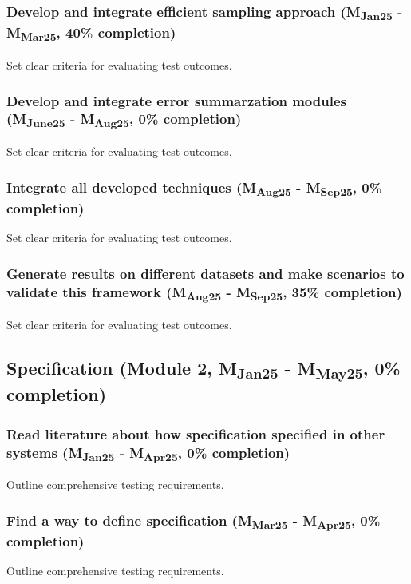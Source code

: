 \subsubsection{Develop and integrate efficient sampling approach (M\textsubscript{Jan25} - M\textsubscript{Mar25}, 40\% completion)}
Set clear criteria for evaluating test outcomes.

\subsubsection{Develop and integrate error summarzation modules (M\textsubscript{June25} - M\textsubscript{Aug25}, 0\% completion)}
Set clear criteria for evaluating test outcomes.

\subsubsection{Integrate all developed techniques (M\textsubscript{Aug25} - M\textsubscript{Sep25}, 0\% completion)}
Set clear criteria for evaluating test outcomes.
\subsubsection{Generate results on different datasets and make scenarios to validate this framework (M\textsubscript{Aug25} - M\textsubscript{Sep25}, 35\% completion)}
Set clear criteria for evaluating test outcomes.



\subsection{Specification (Module 2, M\textsubscript{Jan25} - M\textsubscript{May25}, 0\% completion)}

\subsubsection{Read literature about how specification specified in other systems  (M\textsubscript{Jan25} - M\textsubscript{Apr25}, 0\% completion)}
Outline comprehensive testing requirements.

\subsubsection{Find a way to define specification (M\textsubscript{Mar25} - M\textsubscript{Apr25}, 0\% completion)}
Outline comprehensive testing requirements.

